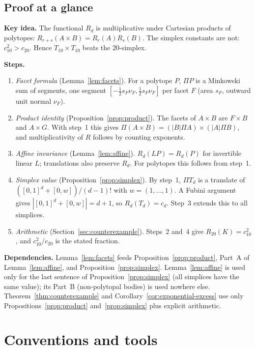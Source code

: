\documentclass[11pt]{article}
\begin{document}
\subsection{Proof at a glance}

\textbf{Key idea.} The functional \(R_d\) is multiplicative under
Cartesian products of polytopes: \(R_{r+s}(A\times B)=R_r(A)R_s(B)\).
The simplex constants are not: \(c_{10}^2>c_{20}\). Hence
\(T_{10}\times T_{10}\) beats the \(20\)-simplex.

\textbf{Steps.}
\begin{enumerate}[label=\arabic*.,leftmargin=2em]
\item \emph{Facet formula} (Lemma~\ref{lem:facets}). For a polytope
 \(P\), \(\Pi P\) is a Minkowski sum of segments, one segment
 \([-\tfrac12s_F\nu_F,\tfrac12s_F\nu_F]\) per facet \(F\) (area
 \(s_F\), outward unit normal \(\nu_F\)).
\item \emph{Product identity} (Proposition~\ref{prop:product}). The
 facets of \(A\times B\) are \(F\times B\) and \(A\times G\). With
 step~1 this gives \(\Pi(A\times B)=(|B|\Pi A)\times(|A|\Pi B)\), and
 multiplicativity of \(R\) follows by counting exponents.
\item \emph{Affine invariance} (Lemma~\ref{lem:affine}).
 \(R_d(LP)=R_d(P)\) for invertible linear \(L\); translations also
 preserve \(R_d\). For polytopes this follows from step~1.
\item \emph{Simplex value} (Proposition~\ref{prop:simplex}). By step~1,
 \(\Pi T_d\) is a translate of \(([0,1]^d+[0,w])/(d-1)!\) with
 \(w=(1,\ldots,1)\). A Fubini argument gives
 \(|[0,1]^d+[0,w]|=d+1\), so \(R_d(T_d)=c_d\). Step~3 extends this to
 all simplices.
\item \emph{Arithmetic} (Section~\ref{sec:counterexample}). Steps~2
 and~4 give \(R_{20}(K)=c_{10}^2\), and \(c_{10}^2/c_{20}\) is the
 stated fraction.
\end{enumerate}

\textbf{Dependencies.} Lemma~\ref{lem:facets} feeds
Proposition~\ref{prop:product}, Part~A of Lemma~\ref{lem:affine}, and
Proposition~\ref{prop:simplex}. Lemma~\ref{lem:affine} is used only for
the last sentence of Proposition~\ref{prop:simplex} (all simplices have
the same value); its Part~B (non-polytopal bodies) is used nowhere
else. Theorem~\ref{thm:counterexample} and
Corollary~\ref{cor:exponential-excess} use only
Propositions~\ref{prop:product} and~\ref{prop:simplex} plus explicit
arithmetic.

\section{Conventions and tools}\label{sec:tools}
\end{document}

